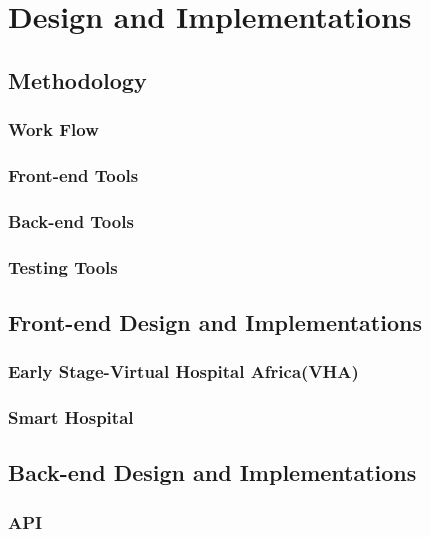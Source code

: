 %
%
\chapter{Design and Implementations}
\label{chap:D&I}

\section{Methodology}
\label{sec:sec01}

\subsection{Work Flow}
\label{subsec:subsec01}

\subsection{Front-end Tools}
\label{subsec:FETools}


\subsection{Back-end Tools}
\label{subsec:subsec04}

\subsection{Testing Tools}
\label{subsec:subsec05}

\section{Front-end Design and Implementations}
\label{sec:sec02}

\subsection{Early Stage-Virtual Hospital Africa(VHA)}
\label{subsec:subsec01}


\subsection{Smart Hospital}
\label{subsec:subsec02}


\section{Back-end Design and Implementations}
\label{sec:sec03}

\subsection{API}
\label{subsec:subsec01}

